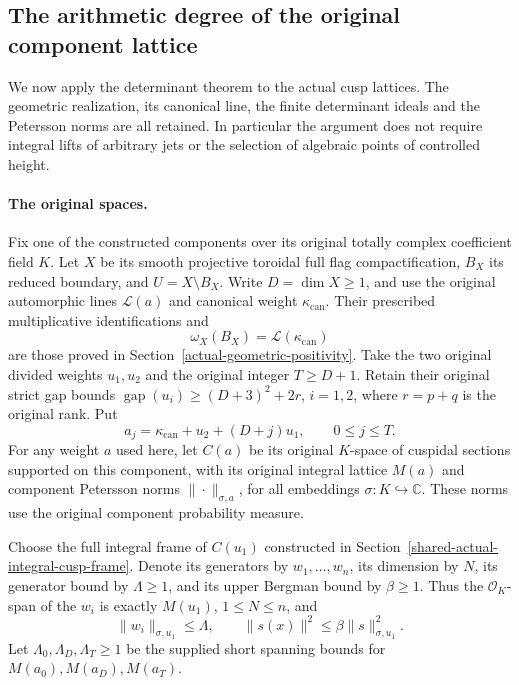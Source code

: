 \subsection{The arithmetic degree of the original component lattice}
\label{sec:actual-component-section-degree}

We now apply the determinant theorem to the actual cusp lattices.
The geometric realization, its canonical line, the finite determinant
ideals and the Petersson norms are all retained.  In particular the
argument does not require integral lifts of arbitrary jets or the
selection of algebraic points of controlled height.

\paragraph{The original spaces.}
Fix one of the constructed components over its original totally complex
coefficient field $K$.  Let $X$ be its smooth projective toroidal full
flag compactification, $B_X$ its reduced boundary, and $U=X\setminus B_X$.
Write $D=\dim X\ge1$, and use the original automorphic lines
$\mathcal L(a)$ and canonical weight $\kappa_{\mathrm{can}}$.  Their
prescribed multiplicative identifications and
\[
                  \omega_X(B_X)=\mathcal L(\kappa_{\mathrm{can}})
\]
are those proved in Section~\ref{actual-geometric-positivity}.
Take the two original divided weights $u_1,u_2$ and the original integer
$T\ge D+1$.  Retain their original strict gap bounds
$\operatorname{gap}(u_i)\ge(D+3)^2+2r$, $i=1,2$, where
$r=p+q$ is the original rank.  Put
\[
 a_j=\kappa_{\mathrm{can}}+u_2+(D+j)u_1,\qquad 0\le j\le T.
\]
For any weight $a$ used here, let $C(a)$ be its original $K$-space of
cuspidal sections supported on this component, with its original
integral lattice $M(a)$ and component Petersson norms
$\|\cdot\|_{\sigma,a}$, for all embeddings $\sigma:K\hookrightarrow
\mathbb C$.  These norms use the original component probability
measure.

Choose the full integral frame of $C(u_1)$ constructed in
Section~\ref{shared-actual-integral-cusp-frame}.  Denote its generators
by $w_1,\ldots,w_n$, its dimension by $N$, its generator bound by
$\Lambda\ge1$, and its upper Bergman bound by $\beta\ge1$.
Thus the $\mathcal O_K$-span of the $w_i$ is exactly $M(u_1)$,
$1\le N\le n$, and
\begin{equation}\label{eq:actual-section-frame}
 \|w_i\|_{\sigma,u_1}\le\Lambda,\qquad
 \|s(x)\|^2\le\beta\|s\|_{\sigma,u_1}^2.
\end{equation}
Let $\Lambda_0,\Lambda_D,\Lambda_T\ge1$ be the supplied short
spanning bounds for $M(a_0),M(a_D),M(a_T)$.


